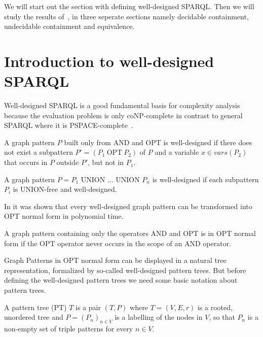 We will start out the section with defining well-designed SPARQL. Then we will
study the results of~\cite{pichler2014containment}, in three seperate
sections namely decidable containment, undecidable containment and equivalence.

\section{Introduction to well-designed SPARQL}
Well-designed SPARQL is a good fundamental basis for complexity analysis because
the evaluation problem is only coNP-complete in contrast to general SPARQL where
it is PSPACE-complete~\cite{perez2009semantics}.

\begin{definition}
	A graph pattern $P$ built only from AND and OPT is well-designed if there does
	not exist a subpattern $P' = (P_1 \  \mbox{OPT} \ P_2)$ of $P$ and a
	variable $x \in	vars(P_2)$ that occurs in $P$ outside $P'$, but not in $P_1$. 
	
	A graph pattern $P = P_1 \mbox{ UNION } \dots \mbox{ UNION } P_n$ is
	well-designed if each subpattern $P_i$ is UNION-free and well-designed.
\end{definition}

In \cite{letelier2013static} it was shown that every well-designed graph pattern
can be transformed into OPT normal form in polynomial time. 
\begin{definition}
	A graph pattern containing only the operators AND and OPT is in OPT normal form
	if the OPT operator never occurs in the scope of an AND operator. 
\end{definition}

Graph Patterns in OPT normal form can be displayed in a natural tree representation, 
formalized by so-called well-designed pattern trees. But before defining the
well-designed pattern trees we need some basic notation about pattern trees.

\begin{definition}\label{def:pt}
	A pattern tree (PT) $T$ is a pair $(T,P)$ where  $T= (V,E,r)$ is a rooted,
	unordered tree and $P = (P_n)_{n \in V}$ is a labelling of the nodes in $V$,
	so that $P_n$ is a non-empty set of triple patterns for every $n \in V$.  
\end{definition}

